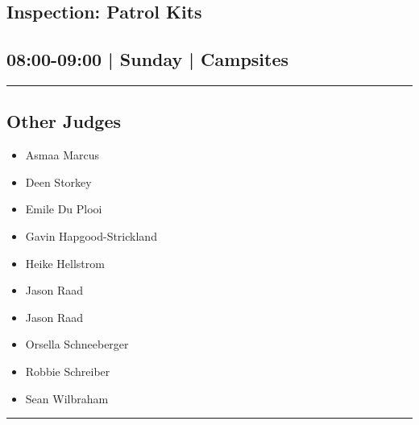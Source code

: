 \documentclass[10pt, A5]{article}
\begin{document}
        \begin{framed}
        \begin{minipage}{\textwidth}

        \setcounter{section}{58}
        \section{Inspection: Patrol Kits}
        \subsection*{08:00-09:00 | Sunday | Campsites}

        \vspace{0.25cm}
        \hrule
        \vspace{0.25cm}


        \subsection*{Other Judges}
                    

        	\begin{multicols}{2}

		\begin{itemize}
									\item Asmaa Marcus
									\item Deen Storkey
									\item Emile Du Plooi
									\item Gavin Hapgood-Strickland
									\item Heike Hellstrom
									\item Jason Raad
						\end{itemize}

		\vfill\null
		\columnbreak

		\begin{itemize}
									\item Jason Raad
									\item Orsella Schneeberger
									\item Robbie Schreiber
									\item Sean Wilbraham
						\end{itemize}

		\vfill\null

		\end{multicols}

    \vspace{0.25cm}
        \hrule
        \vspace{0.25cm}


\end{minipage}
\end{framed}
\end{document}
